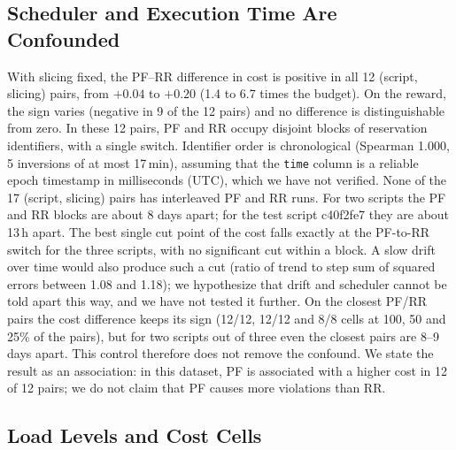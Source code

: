 \subsection{Scheduler and Execution Time Are Confounded}
\label{sec:confound}

With slicing fixed, the PF--RR difference in cost is positive in all 12 (script, slicing) pairs, from $+0.04$ to $+0.20$ (1.4 to 6.7 times the budget).%
On the reward, the sign varies (negative in 9 of the 12 pairs) and no difference is distinguishable from zero.%
In these 12 pairs, PF and RR occupy disjoint blocks of reservation identifiers, with a single switch.%
Identifier order is chronological (Spearman 1.000, 5 inversions of at most 17\,min), assuming that the \texttt{time} column is a reliable epoch timestamp in milliseconds (UTC), which we have not verified.%
None of the 17 (script, slicing) pairs has interleaved PF and RR runs.%
For two scripts the PF and RR blocks are about 8 days apart; for the test script c40f2fe7 they are about 13\,h apart.%
The best single cut point of the cost falls exactly at the PF-to-RR switch for the three scripts, with no significant cut within a block.%
A slow drift over time would also produce such a cut (ratio of trend to step sum of squared errors between 1.08 and 1.18); we hypothesize that drift and scheduler cannot be told apart this way, and we have not tested it further.%
On the closest PF/RR pairs the cost difference keeps its sign (12/12, 12/12 and 8/8 cells at 100, 50 and 25\% of the pairs), but for two scripts out of three even the closest pairs are 8--9 days apart.%
This control therefore does not remove the confound.%
We state the result as an association: in this dataset, PF is associated with a higher cost in 12 of 12 pairs; we do not claim that PF causes more violations than RR.%

\subsection{Load Levels and Cost Cells}
\label{sec:cells}

